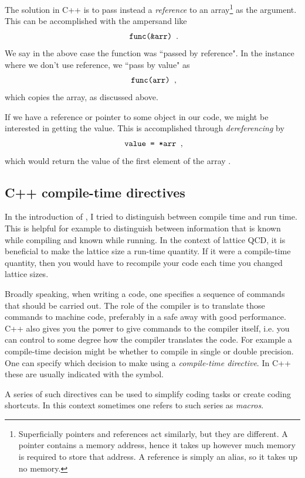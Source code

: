 The solution in C++ is to pass instead a {\it reference} to an 
array\footnote{Superficially pointers and references act similarly, but they are
different. A pointer contains a memory address, hence it takes up however much
memory is required to store that address. A reference is simply an alias, so it
takes up no memory.} as the argument. This can be accomplished with the
ampersand like
\begin{equation*}
\ff{func(\&arr)}.
\end{equation*}
We say in the above case the function was ``passed by reference". In the
instance where we don't use reference, we ``pass by value" as
\begin{equation*}
\ff{func(arr)},
\end{equation*}
which copies the array, as discussed above.

If we have a reference or pointer to some object in our code, we might be interested in
getting the value. This is accomplished through {\it
dereferencing} by
\begin{equation*}
\ff{value = *arr},
\end{equation*}
which would return the value of the first element of the array .

\subsection{C++ compile-time directives}

In the introduction of , I tried to distinguish between compile time
and run time. This is helpful for example to distinguish between information
that is known while compiling and known while running. In the context of lattice
QCD, it is beneficial to make the lattice size a run-time quantity. If it were a
compile-time quantity, then you would have to recompile your code each time you
changed lattice sizes.

Broadly speaking, when writing a code, one specifies a sequence of commands that
should be carried out. The role of the compiler is to translate those commands
to machine code, preferably in a safe away with good performance. C++ also gives
you the power to give commands to the compiler itself, i.e. you can control to
some degree how the compiler translates the code. For example a compile-time
decision might be whether to compile in single or double precision. One can
specify which decision to make using a {\it compile-time
directive}.
In C++ these are usually indicated with the \ff{\#} symbol.

A series of such directives can be used to simplify coding tasks or create
coding shortcuts. In this context sometimes one refers to such series as {\it
macros}.



